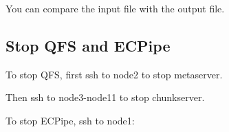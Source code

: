 \documentclass[letterpaper,12pt]{article}
\begin{document}
\begin{center}
\noindent{}
\end{center}

You can compare the input file with the output file.

\subsection{Stop QFS and ECPipe}

To stop QFS, first ssh to node2 to stop metaserver.

\begin{center}
\noindent{}
\end{center}

Then ssh to node3-node11 to stop chunkserver.

\begin{center}
\noindent{}
\end{center}

To stop ECPipe, ssh to node1:

\begin{center}
\noindent{}
\end{center}
\end{document}
